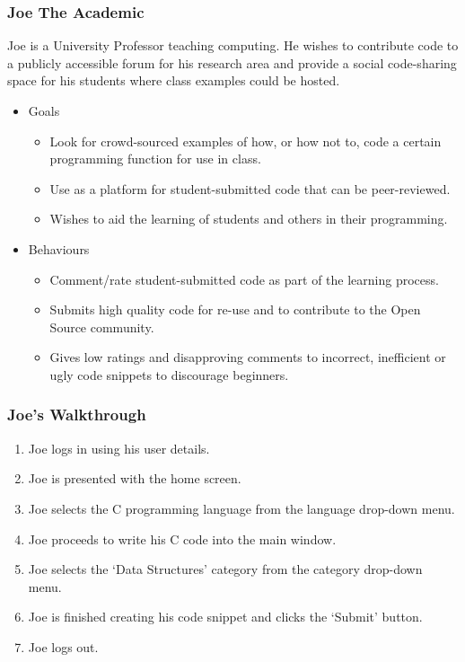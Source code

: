 \documentclass[handout, t]{beamer}
\begin{document}
\begin{frame}
\frametitle{Joe The Academic}
Joe is a University Professor teaching computing. He wishes to contribute
code to a publicly accessible forum for his research area and provide
a social code-sharing space for his students where class examples could
be hosted.
\begin{itemize}
\item Goals
    \begin{itemize}
    \item Look for crowd-sourced examples of how, or how not to, code a certain
    programming function for use in class.
    \item Use as a platform for student-submitted code that can be peer-reviewed.
    \item Wishes to aid the learning of students and others in their programming.
    \end{itemize}
\item Behaviours
    \begin{itemize}
    \item Comment/rate student-submitted code as part of the learning process.
    \item Submits high quality code for re-use and to contribute to the Open
    Source community.
    \item Gives low ratings and disapproving comments to incorrect,
    inefficient or ugly code snippets to discourage beginners.
    \end{itemize}
\end{itemize}
\end{frame}



\begin{frame}
\frametitle{Joe's Walkthrough}
\begin{enumerate}
\item Joe logs in using his user details.
\item Joe is presented with the home screen.
\item Joe selects the C programming language from the language drop-down
menu.
\item Joe proceeds to write his C code into the main window.
\item Joe selects the `Data Structures' category from the category
drop-down menu.
\item Joe is finished creating his code snippet and clicks the `Submit'
button.
\item Joe logs out.
\end{enumerate}
\end{frame}
\end{document}
